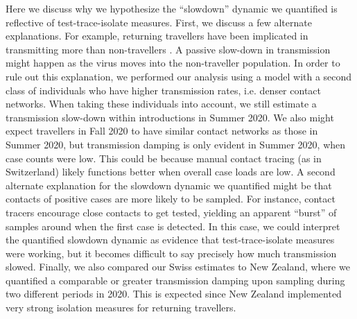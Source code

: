 \documentclass[9pt,twoside,lineno]{pnas-new} %
\begin{document}
Here we discuss why we hypothesize the ``slowdown'' dynamic we quantified is reflective of test-trace-isolate measures. First, we discuss a few alternate explanations. For example, returning travellers have been implicated in transmitting more than non-travellers \cite{Hodcroft2021}. A passive slow-down in transmission might happen as the virus moves into the non-traveller population. In order to rule out this explanation, we performed our analysis using a model with a second class of individuals who have higher transmission rates, i.e. denser contact networks. When taking these individuals into account, we still estimate a transmission slow-down within introductions in Summer 2020. We also might expect travellers in Fall 2020 to have similar contact networks as those in Summer 2020, but transmission damping is only evident in Summer 2020, when case counts were low. This could be because manual contact tracing (as in Switzerland) likely functions better when overall case loads are low. A second alternate explanation for the slowdown dynamic we quantified might be that contacts of positive cases are more likely to be sampled. For instance, contact tracers encourage close contacts to get tested, yielding an apparent ``burst'' of samples around when the first case is detected. In this case, we could interpret the quantified slowdown dynamic as evidence that test-trace-isolate measures were working, but it becomes difficult to say precisely how much transmission slowed. Finally, we also compared our Swiss estimates to New Zealand, where we quantified a comparable or greater transmission damping upon sampling during two different periods in 2020. This is expected since New Zealand implemented very strong isolation measures for returning travellers.

\end{document}
